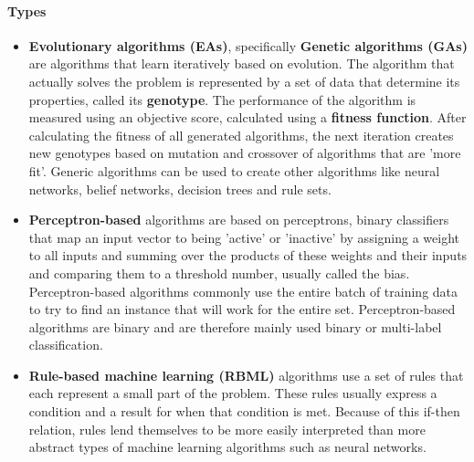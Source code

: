 \paragraph{Types}
\begin{itemize}
	\item \textbf{Evolutionary algorithms (EAs)},
		specifically \textbf{Genetic algorithms (GAs)} are algorithms that learn iteratively based on evolution. The algorithm that actually solves the problem is represented by a set of data that determine its properties, called its \textbf{genotype}. The performance of the algorithm is measured using an objective score, calculated using a \textbf{fitness function}. After calculating the fitness of all generated algorithms, the next iteration creates new genotypes based on mutation and crossover of algorithms that are 'more fit'. Generic algorithms can be used to create other algorithms like neural networks, belief networks, decision trees and rule sets.
	\item \textbf{Perceptron-based}
		algorithms are based on perceptrons, binary classifiers that map an input vector to being 'active' or 'inactive' by assigning a weight to all inputs and summing over the products of these weights and their inputs and comparing them to a threshold number, usually called the bias. Perceptron-based algorithms commonly use the entire batch of training data to try to find an instance that will work for the entire set. Perceptron-based algorithms are binary and are therefore mainly used binary or multi-label classification.
	\item \textbf{Rule-based machine learning (RBML)}
		algorithms use a set of rules that each represent a small part of the problem. These rules usually express a condition and a result for when that condition is met. Because of this if-then relation, rules lend themselves to be more easily interpreted than more abstract types of machine learning algorithms such as neural networks.
\end{itemize}

